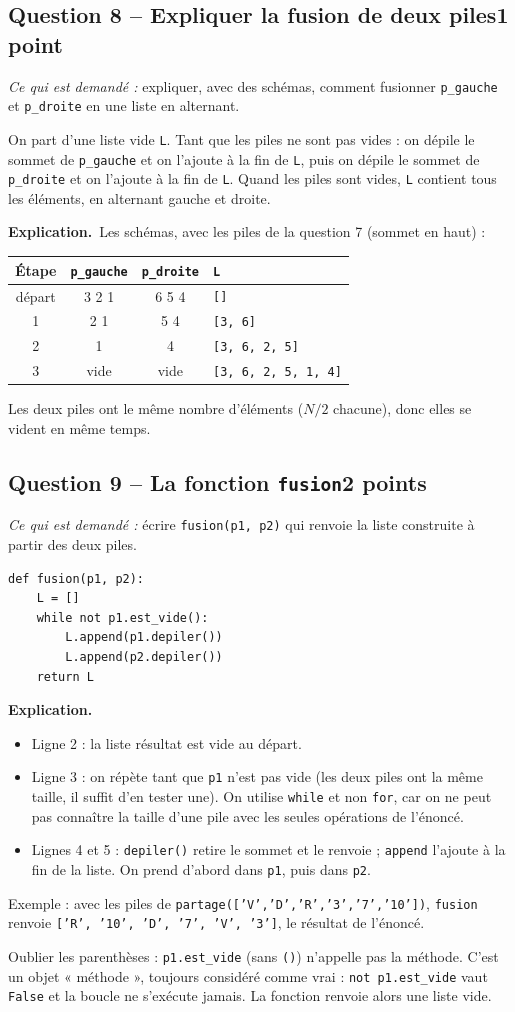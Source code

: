 \documentclass[11pt, a4paper]{exam}
\newcommand{\code}[1]{\texttt{#1}}
\newcommand{\Qt}[2]{\subsection*{#1\hfill{\normalfont\small #2}}}
\newcommand{\rappel}[1]{\noindent\textit{Ce qui est demandé :} #1\par\smallskip}
\newcommand{\explication}{\noindent\textbf{Explication.}\ }
\begin{document}
\Qt{Question 8 -- Expliquer la fusion de deux piles}{1 point}
\rappel{expliquer, avec des schémas, comment fusionner \code{p\_gauche} et \code{p\_droite} en une liste en alternant.}
\begin{reponse}
On part d'une liste vide \code{L}. Tant que les piles ne sont pas vides : on dépile le sommet de \code{p\_gauche} et on l'ajoute à la fin de \code{L}, puis on dépile le sommet de \code{p\_droite} et on l'ajoute à la fin de \code{L}. Quand les piles sont vides, \code{L} contient tous les éléments, en alternant gauche et droite.
\end{reponse}
\explication Les schémas, avec les piles de la question 7 (sommet en haut) :
\begin{center}\small
\begin{tabular}{|c|c|c|l|}\hline
Étape & \code{p\_gauche} & \code{p\_droite} & \code{L} \\\hline
départ & 3 2 1 & 6 5 4 & \code{[]} \\
1 & 2 1 & 5 4 & \code{[3, 6]} \\
2 & 1 & 4 & \code{[3, 6, 2, 5]} \\
3 & vide & vide & \code{[3, 6, 2, 5, 1, 4]} \\\hline
\end{tabular}
\end{center}
Les deux piles ont le même nombre d'éléments ($N/2$ chacune), donc elles se vident en même temps.

\Qt{Question 9 -- La fonction \code{fusion}}{2 points}
\rappel{écrire \code{fusion(p1, p2)} qui renvoie la liste construite à partir des deux piles.}
\begin{reponse}
\begin{lstlisting}
def fusion(p1, p2):
    L = []
    while not p1.est_vide():
        L.append(p1.depiler())
        L.append(p2.depiler())
    return L
\end{lstlisting}
\end{reponse}
\explication
\begin{itemize}
\item Ligne 2 : la liste résultat est vide au départ.
\item Ligne 3 : on répète tant que \code{p1} n'est pas vide (les deux piles ont la même taille, il suffit d'en tester une). On utilise \code{while} et non \code{for}, car on ne peut pas connaître la taille d'une pile avec les seules opérations de l'énoncé.
\item Lignes 4 et 5 : \code{depiler()} retire le sommet et le renvoie ; \code{append} l'ajoute à la fin de la liste. On prend d'abord dans \code{p1}, puis dans \code{p2}.
\end{itemize}
Exemple : avec les piles de \code{partage(['V','D','R','3','7','10'])}, \code{fusion} renvoie \code{['R', '10', 'D', '7', 'V', '3']}, le résultat de l'énoncé.

\begin{erreur}
Oublier les parenthèses : \code{p1.est\_vide} (sans \code{()}) n'appelle pas la méthode. C'est un objet « méthode », toujours considéré comme vrai : \code{not p1.est\_vide} vaut \code{False} et la boucle ne s'exécute jamais. La fonction renvoie alors une liste vide.
\end{erreur}
\end{document}
